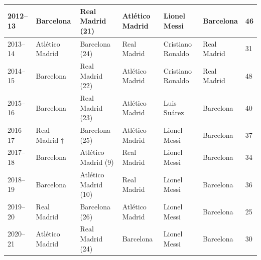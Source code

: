 \documentclass[]{tufte-handout}
\begin{document}
\begin{table}
\begin{tabular}{l|l|l|l|l|l|l}
\hline
2012–13 & Barcelona & Real Madrid (21) & Atlético Madrid & Lionel Messi & Barcelona & 46\\
\hline
2013–14 & Atlético Madrid & Barcelona (24) & Real Madrid & Cristiano Ronaldo & Real Madrid & 31\\
\hline
2014–15 & Barcelona & Real Madrid (22) & Atlético Madrid & Cristiano Ronaldo & Real Madrid & 48\\
\hline
2015–16 & Barcelona & Real Madrid (23) & Atlético Madrid & Luis Suárez & Barcelona & 40\\
\hline
2016–17 & Real Madrid  † & Barcelona (25) & Atlético Madrid & Lionel Messi & Barcelona & 37\\
\hline
2017–18 & Barcelona & Atlético Madrid (9) & Real Madrid & Lionel Messi & Barcelona & 34\\
\hline
2018–19 & Barcelona & Atlético Madrid (10) & Real Madrid & Lionel Messi & Barcelona & 36\\
\hline
2019–20 & Real Madrid & Barcelona (26) & Atlético Madrid & Lionel Messi & Barcelona & 25\\
\hline
2020–21 & Atlético Madrid & Real Madrid (24) & Barcelona & Lionel Messi & Barcelona & 30\\
\hline
\end{tabular}
\end{table}


\end{document}
